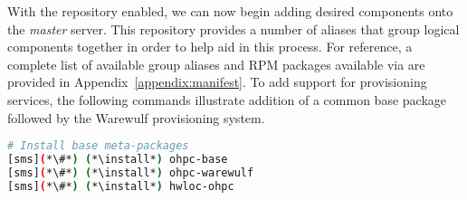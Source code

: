 With the \OHPC{} repository enabled, we can now begin adding desired components onto the
{\em master} server. This repository provides a number of aliases that group
logical components together in order to help aid in this process. For
reference, a complete list of available group aliases and RPM packages available
via \OHPC{} are provided in Appendix~\ref{appendix:manifest}. To add
support for provisioning services, the following commands illustrate addition
of a common base package followed by the Warewulf provisioning system.


\begin{lstlisting}[language=bash,keywords={}]
# Install base meta-packages
[sms](*\#*) (*\install*) ohpc-base
[sms](*\#*) (*\install*) ohpc-warewulf
[sms](*\#*) (*\install*) hwloc-ohpc
\end{lstlisting}



